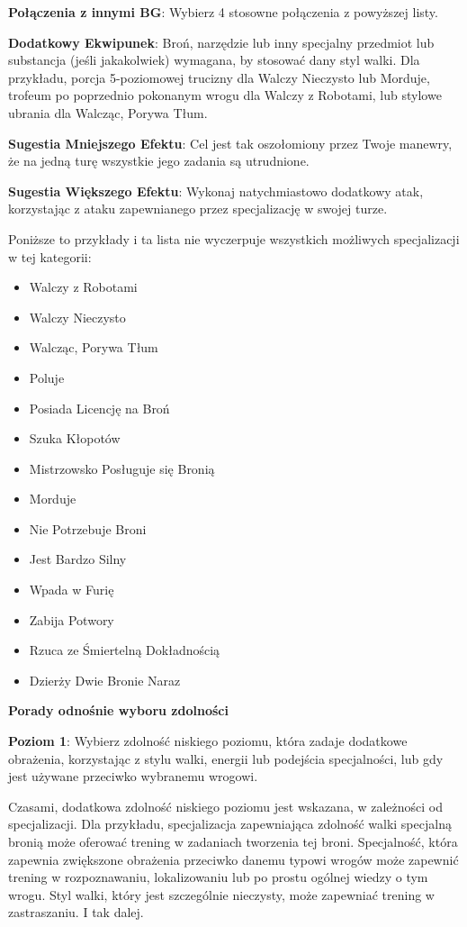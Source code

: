 \textbf{Połączenia z innymi BG}: Wybierz 4 stosowne połączenia z powyższej listy.

\textbf{Dodatkowy Ekwipunek}: Broń, narzędzie lub inny specjalny przedmiot lub substancja (jeśli jakakolwiek) wymagana, by stosować dany styl walki. Dla przykładu, porcja 5-poziomowej trucizny dla Walczy Nieczysto lub Morduje, trofeum po poprzednio pokonanym wrogu dla Walczy z Robotami, lub stylowe ubrania dla Walcząc, Porywa Tłum.

\textbf{Sugestia Mniejszego Efektu}: Cel jest tak oszołomiony przez Twoje manewry, że na jedną turę wszystkie jego zadania są utrudnione. 

\textbf{Sugestia Większego Efektu}: Wykonaj natychmiastowo dodatkowy atak, korzystając z ataku zapewnianego przez specjalizację w swojej turze.

Poniższe to przykłady i ta lista nie wyczerpuje wszystkich możliwych specjalizacji w tej kategorii:

\begin{itemize}
\item Walczy z Robotami
\item Walczy Nieczysto
\item Walcząc, Porywa Tłum 
\item Poluje
\item Posiada Licencję na Broń
\item Szuka Kłopotów
\item Mistrzowsko Posługuje się Bronią
\item Morduje
\item Nie Potrzebuje Broni
\item Jest Bardzo Silny
\item Wpada w Furię
\item Zabija Potwory
\item Rzuca ze Śmiertelną Dokładnością
\item Dzierży Dwie Bronie Naraz
\end{itemize}

\textbf{Porady odnośnie wyboru zdolności}

\textbf{Poziom 1}: Wybierz zdolność niskiego poziomu, która zadaje dodatkowe obrażenia, korzystając z stylu walki, energii lub podejścia specjalności, lub gdy jest używane przeciwko wybranemu wrogowi.

Czasami, dodatkowa zdolność niskiego poziomu jest wskazana, w zależności od specjalizacji. Dla przykładu, specjalizacja zapewniająca zdolność walki specjalną bronią może oferować trening w zadaniach tworzenia tej broni. Specjalność, która zapewnia zwiększone obrażenia przeciwko danemu typowi wrogów może zapewnić trening w rozpoznawaniu, lokalizowaniu lub po prostu ogólnej wiedzy o tym wrogu. Styl walki, który jest szczególnie nieczysty, może zapewniać trening w zastraszaniu. I tak dalej.

